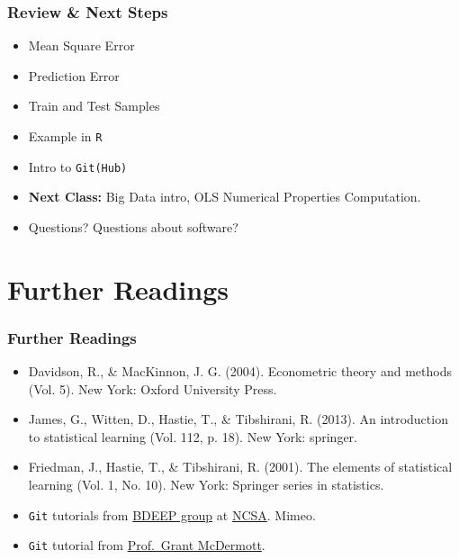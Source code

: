 \documentclass[
  shownotes,
  xcolor={svgnames},
  hyperref={colorlinks,citecolor=DarkBlue,linkcolor=DarkRed,urlcolor=DarkBlue}
  ]{beamer}
\begin{document}
\begin{frame}
\frametitle{Review \& Next Steps}
  
  \begin{itemize} 
    \item Mean Square Error
    \item Prediction Error
    \item Train and Test Samples
    \item Example in \texttt{R}
    \item Intro to \texttt{Git(Hub)}
  \bigskip  

  
  \item  {\bf Next Class:} Big Data intro, OLS Numerical Properties Computation.
  \bigskip
  \item Questions? Questions about software? 
  
  \end{itemize}


\end{frame}

\section{Further Readings}
\begin{frame}
\frametitle{Further Readings}

\begin{itemize}
  \item Davidson, R., \& MacKinnon, J. G. (2004). Econometric theory and methods (Vol. 5). New York: Oxford University Press.
  \bigskip
  \item James, G., Witten, D., Hastie, T., \& Tibshirani, R. (2013). An introduction to statistical learning (Vol. 112, p. 18). New York: springer.
  \bigskip
  \item Friedman, J., Hastie, T., \& Tibshirani, R. (2001). The elements of statistical learning (Vol. 1, No. 10). New York: Springer series in statistics.
  \bigskip
  \item \texttt{Git} tutorials from \href{https://www.uiuc-bdeep.org/about}{BDEEP group} at \href{http://www.ncsa.illinois.edu/site}{NCSA}. Mimeo.
  \bigskip
  \item \texttt{Git} tutorial from  \href{https://grantmcdermott.com/}{Prof.~Grant McDermott}.


\end{itemize}

\end{frame}
\end{document}
